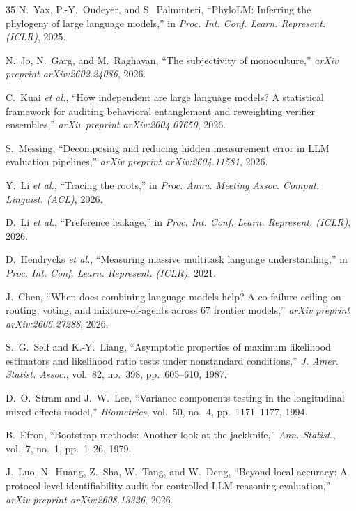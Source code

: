 \documentclass[11pt]{article}
\theoremstyle{definition}
\theoremstyle{plain}
\begin{document}
\begin{thebibliography}{35}
 N.~Yax, P.-Y.~Oudeyer, and S.~Palminteri, ``PhyloLM:
Inferring the phylogeny of large language models,'' in \emph{Proc. Int. Conf.
Learn. Represent. (ICLR)}, 2025.

 N.~Jo, N.~Garg, and M.~Raghavan, ``The subjectivity of
monoculture,'' \emph{arXiv preprint arXiv:2602.24086}, 2026.

 C.~Kuai \emph{et al.}, ``How independent are large language
models? A statistical framework for auditing behavioral entanglement and
reweighting verifier ensembles,'' \emph{arXiv preprint arXiv:2604.07650}, 2026.

 S.~Messing, ``Decomposing and reducing hidden measurement
error in LLM evaluation pipelines,'' \emph{arXiv preprint arXiv:2604.11581}, 2026.

 Y.~Li \emph{et al.}, ``Tracing the roots,'' in \emph{Proc.
Annu. Meeting Assoc. Comput. Linguist. (ACL)}, 2026.

 D.~Li \emph{et al.}, ``Preference leakage,'' in \emph{Proc.
Int. Conf. Learn. Represent. (ICLR)}, 2026.

 D.~Hendrycks \emph{et al.}, ``Measuring massive multitask
language understanding,'' in \emph{Proc. Int. Conf. Learn. Represent. (ICLR)},
2021.

 J.~Chen, ``When does combining language models help? A
co-failure ceiling on routing, voting, and mixture-of-agents across 67 frontier
models,'' \emph{arXiv preprint arXiv:2606.27288}, 2026.

 S.~G.~Self and K.-Y.~Liang, ``Asymptotic properties of
maximum likelihood estimators and likelihood ratio tests under nonstandard
conditions,'' \emph{J. Amer. Statist. Assoc.}, vol.~82, no.~398, pp.~605--610,
1987.

 D.~O.~Stram and J.~W.~Lee, ``Variance components testing in
the longitudinal mixed effects model,'' \emph{Biometrics}, vol.~50, no.~4,
pp.~1171--1177, 1994.

 B.~Efron, ``Bootstrap methods: Another look at the
jackknife,'' \emph{Ann. Statist.}, vol.~7, no.~1, pp.~1--26, 1979.

 J.~Luo, N.~Huang, Z.~Sha, W.~Tang, and W.~Deng, ``Beyond local accuracy: A protocol-level identifiability audit for controlled LLM reasoning evaluation,'' \emph{arXiv preprint arXiv:2608.13326}, 2026.

\end{thebibliography}
\end{document}
